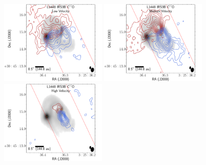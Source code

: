 \begin{figure}[H]
\begin{center}
   \includegraphics[width=0.45\textwidth]{img/L1448IRS3B_C17O_image_taper1500k__splitMoments_low.pdf} 
   \includegraphics[width=0.45\textwidth]{img/L1448IRS3B_C17O_image_taper1500k__splitMoments_med.pdf} 
   \includegraphics[width=0.45\textwidth]{img/L1448IRS3B_C17O_image_taper1500k__splitMoments_high.pdf}  %
\end{center}

\end{figure}
